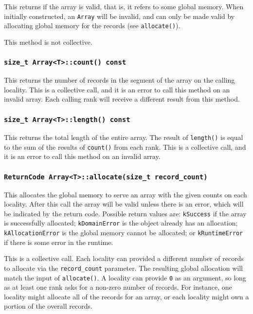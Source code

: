 This returns if the array is valid, that is, it refers to some global memory.
When initially constructed, an \texttt{Array} will be invalid, and can only be
made valid by allocating global memory for the records (see
\texttt{allocate()}).

This method is not collective.

\subsubsection{\texttt{size\_t Array<T>::count() const}}

This returns the number of records in the segment of the array on the calling
locality. This is a collective call, and it is an error to call this method
on an invalid array. Each calling rank will receive a different result from
this method.

\subsubsection{\texttt{size\_t Array<T>::length() const}}

This returns the total length of the entire array. The result of
\texttt{length()} is equal to the sum of the results of \texttt{count()} from
each rank. This is a collective call, and it is an error to call this method
on an invalid array.

\subsubsection{\texttt{ReturnCode Array<T>::allocate(size\_t record\_count)}}

This allocates the global memory to serve an array with the given counts on
each locality. After this call the array will be valid unless there is an
error, which will be indicated by the return code. Possible return values are:
\texttt{kSuccess} if the array is successfully allocated; \texttt{kDomainError}
is the object already has an allocation; \texttt{kAllocationError} is the
global memory cannot be allocated; or \texttt{kRuntimeError} if there is some
error in the runtime.

This is a collective call. Each locality can provided a different number of
records to allocate via the \texttt{record\_count} parameter. The resulting
global allocation will match the input of \texttt{allocate()}. A locality can
provide \texttt{0} as an argument, so long as at least one rank asks for a
non-zero number of records. For instance, one locality might allocate all of
the records for an array, or each locality might own a portion of the overall
records.

